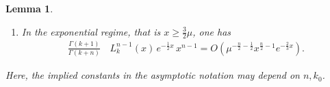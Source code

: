 \documentclass[11pt, reqno]{amsart}
\theoremstyle{plain}
\newtheorem{lemma}[theorem]{Lemma}
\theoremstyle{remark}
\theoremstyle{example}
\theoremstyle{definition}
\numberwithin{equation}{section}
\begin{document}
\begin{lemma}
\begin{enumerate}
\begin{enumerate}
 \item [\emph{(\emph{c})}] \hspace*{.7mm} If $ \mu + c \, \mu^{1/3} \leq x \, \leq {\textstyle \frac{3}{2}} \mu$, then
    \begin{equation}\label{Airy merging with exponential}
        \begin{split}
            \frac{\Gamma(k+1)}{\Gamma(k+n)} \,   & L^{n-1}_{k}(x) \, e^{- \frac{1}{2} x} \,  x^{n-1} \\
            & = \, (-1)^{k} \mu^{{-\textstyle\frac{4}{3}} } \,   \mu^{ {\textstyle\frac{1}{12} } }  (x- \mu)^{ - {\textstyle\frac{1}{4}  } } \, e^{ - {\frac{2}{3}  } \mu^{- \frac{1}{2}} (x- \mu)^{3/2}    } \left[   1 + O \left(   \mu^{-\frac{1}{4}} (x - \mu )^{- \frac{3}{4}}  \right)    \right].
        \end{split}
    \end{equation}  
    \end{enumerate}
    \item[\emph{(3)}] In the exponential regime, that is $x \geq \frac{3}{2} \mu$, one has
     \begin{equation}\label{expo regime}
        \begin{split}
            \frac{\Gamma(k+1)}{\Gamma(k+n)} \,   & L^{n-1}_{k}(x) \, e^{- \frac{1}{2} x} \,  x^{n-1} = O \left( \mu^{ -\frac{n}{2}-\frac{1}{2}} x^{\frac{n}{2}-1} e^{- \frac{2}{3} x}  \right).
        \end{split}
    \end{equation} 
\end{enumerate}
Here, the implied constants in the asymptotic notation may depend on $n, k_{0}$. 
\end{lemma}
\end{document}
